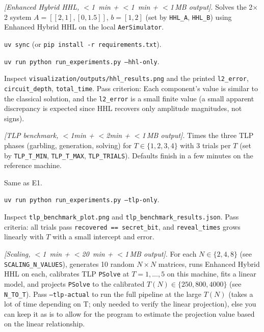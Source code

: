 \documentclass[nonacm,sigconf]{acmart}
\begin{document}
\begin{compactitem}
\item[(E1):] \emph{[Enhanced Hybrid HHL, $<$1~min + $<$1~min + $<$1\,MB output]}.
  Solves the 2$\times$2 system $A=[[2,1],[0,1.5]]$, $b=[1,2]$ (set
  by \texttt{HHL\_A}, \texttt{HHL\_B}) using Enhanced Hybrid HHL on
  the local \texttt{AerSimulator}.

  \begin{asparadesc}
  \item[Preparation:] \texttt{uv sync} (or
    \texttt{pip install -r requirements.txt}).

  \item[Execution:]
    \texttt{uv run python run\_experiments.py --hhl-only}.

  \item[Results:] Inspect
    \texttt{visualization/}\-\texttt{outputs/}\-\texttt{hhl\_results.png}
    and the printed \texttt{l2\_error}, \texttt{circuit\_depth},
    \texttt{total\_time}.  Pass criterion: Each component's value is 
    similar to the classical solution, and the \texttt{l2\_error} is
    a small finite value (a small apparent discrepancy is expected since HHL
    recovers only amplitude magnitudes, not signs).
  \end{asparadesc}

\item[(E2):] \emph{[TLP benchmark, $<$1min + $<$2min + $<$1\,MB output]}.
  Times the three TLP phases (garbling, generation, solving) for
  $T\in\{1,2,3,4\}$ with 3 trials per $T$ (set by
  \texttt{TLP\_T\_MIN}, \texttt{TLP\_T\_MAX}, \texttt{TLP\_TRIALS}).
  Defaults finish in a few minutes on the reference machine.

  \begin{asparadesc}
  \item[Preparation:] Same as E1.

  \item[Execution:]
    \texttt{uv run python run\_experiments.py --tlp-only}.

  \item[Results:] Inspect \texttt{tlp\_benchmark\_plot.png} and
    \texttt{tlp\_benchmark\_results.json}.  Pass criteria: all
    trials pass \texttt{recovered == secret\_bit}, and
    \texttt{reveal\_times} grows linearly with $T$ with a small intercept and error.
  \end{asparadesc}

\item[(E3):] \emph{[Scaling, $<$1~min + $<$20~min + $<$1\,MB output]}.
  For each $N\in\{2,4,8\}$ (see \texttt{SCALING\_N\_VALUES}),
  generates 10 random $N{\times}N$ matrices, runs Enhanced Hybrid
  HHL on each, calibrates TLP \texttt{PSolve} at
  $T=1,\ldots,5$ on this machine, fits a linear model, and projects
  \texttt{PSolve} to the calibrated $T(N)\in\{250,800,4000\}$ (see
  \texttt{N\_TO\_T}).  Pass \texttt{--tlp-actual} to run the
  full pipeline at the large $T(N)$ (takes a lot of time depending on T; only needed
  to verify the linear projection), else you can keep it as is to allow for the 
  program to estimate the projection value based on the linear relationship.


\end{compactitem}
\end{document}

